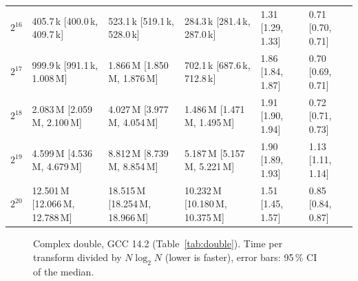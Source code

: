 \begin{table}[h]
\begin{tabular}{rlllll}
$2^{16}$ & 405.7\,k {\scriptsize[400.0\,k, 409.7\,k]} & 523.1\,k {\scriptsize[519.1\,k, 528.0\,k]} & 284.3\,k {\scriptsize[281.4\,k, 287.0\,k]} & 1.31 {\scriptsize[1.29, 1.33]} & 0.71 {\scriptsize[0.70, 0.71]}\\
$2^{17}$ & 999.9\,k {\scriptsize[991.1\,k, 1.008\,M]} & 1.866\,M {\scriptsize[1.850\,M, 1.876\,M]} & 702.1\,k {\scriptsize[687.6\,k, 712.8\,k]} & 1.86 {\scriptsize[1.84, 1.87]} & 0.70 {\scriptsize[0.69, 0.71]}\\
$2^{18}$ & 2.083\,M {\scriptsize[2.059\,M, 2.100\,M]} & 4.027\,M {\scriptsize[3.977\,M, 4.054\,M]} & 1.486\,M {\scriptsize[1.471\,M, 1.495\,M]} & 1.91 {\scriptsize[1.90, 1.94]} & 0.72 {\scriptsize[0.71, 0.73]}\\
$2^{19}$ & 4.599\,M {\scriptsize[4.536\,M, 4.679\,M]} & 8.812\,M {\scriptsize[8.739\,M, 8.854\,M]} & 5.187\,M {\scriptsize[5.157\,M, 5.221\,M]} & 1.90 {\scriptsize[1.89, 1.93]} & 1.13 {\scriptsize[1.11, 1.14]}\\
$2^{20}$ & 12.501\,M {\scriptsize[12.066\,M, 12.788\,M]} & 18.515\,M {\scriptsize[18.254\,M, 18.966\,M]} & 10.232\,M {\scriptsize[10.180\,M, 10.375\,M]} & 1.51 {\scriptsize[1.45, 1.57]} & 0.85 {\scriptsize[0.84, 0.87]}\\
\bottomrule\end{tabular}\end{table}

\begin{figure}[h]\centering{}\caption{Complex double, GCC 14.2 (Table~\ref{tab:double}). Time per transform divided by $N\log_2 N$ (lower is faster), error bars: 95\,\% CI of the median.}\label{fig:double}\end{figure}

